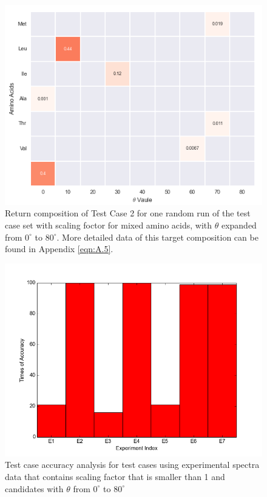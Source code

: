 \begin{figure}[!ht] 
\centering
\includegraphics[scale=0.9]{Figures/chapter6_figure_two.png}
\caption{Return composition of Test Case 2 for one random run of the test case set with scaling foctor for mixed amino acids, with $\theta$ expanded from $0^{\circ}$ to $80^{\circ}$. More detailed data of this target composition can be found in Appendix \ref{eqn:A.5}.} \label{fig:6.2}
\end{figure}

\begin{figure}[!ht] 
\centering
\includegraphics[scale=0.6]{Figures/chapter6_1.png}
\caption{Test case accuracy analysis for test cases using experimental spectra data that contains scaling factor that is smaller than 1 and candidates with $\theta$ from $0^{\circ}$ to $80^{\circ}$}
\label{fig:6.3}
\end{figure}

